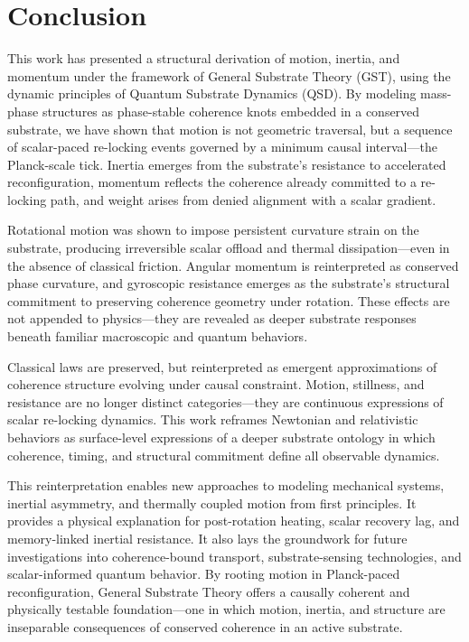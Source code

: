 \documentclass[preprints,article,submit,pdftex,moreauthors]{Definitions/mdpi}
\begin{document}
\section{Conclusion}
This work has presented a structural derivation of motion, inertia, and momentum under the framework of General Substrate Theory (GST), using the dynamic principles of Quantum Substrate Dynamics (QSD). By modeling mass-phase structures as phase-stable coherence knots embedded in a conserved substrate, we have shown that motion is not geometric traversal, but a sequence of scalar-paced re-locking events governed by a minimum causal interval—the Planck-scale tick. Inertia emerges from the substrate’s resistance to accelerated reconfiguration, momentum reflects the coherence already committed to a re-locking path, and weight arises from denied alignment with a scalar gradient.

Rotational motion was shown to impose persistent curvature strain on the substrate, producing irreversible scalar offload and thermal dissipation—even in the absence of classical friction. Angular momentum is reinterpreted as conserved phase curvature, and gyroscopic resistance emerges as the substrate’s structural commitment to preserving coherence geometry under rotation. These effects are not appended to physics—they are revealed as deeper substrate responses beneath familiar macroscopic and quantum behaviors.

Classical laws are preserved, but reinterpreted as emergent approximations of coherence structure evolving under causal constraint. Motion, stillness, and resistance are no longer distinct categories—they are continuous expressions of scalar re-locking dynamics. This work reframes Newtonian and relativistic behaviors as surface-level expressions of a deeper substrate ontology in which coherence, timing, and structural commitment define all observable dynamics.

This reinterpretation enables new approaches to modeling mechanical systems, inertial asymmetry, and thermally coupled motion from first principles. It provides a physical explanation for post-rotation heating, scalar recovery lag, and memory-linked inertial resistance. It also lays the groundwork for future investigations into coherence-bound transport, substrate-sensing technologies, and scalar-informed quantum behavior. By rooting motion in Planck-paced reconfiguration, General Substrate Theory offers a causally coherent and physically testable foundation—one in which motion, inertia, and structure are inseparable consequences of conserved coherence in an active substrate.
\end{document}
